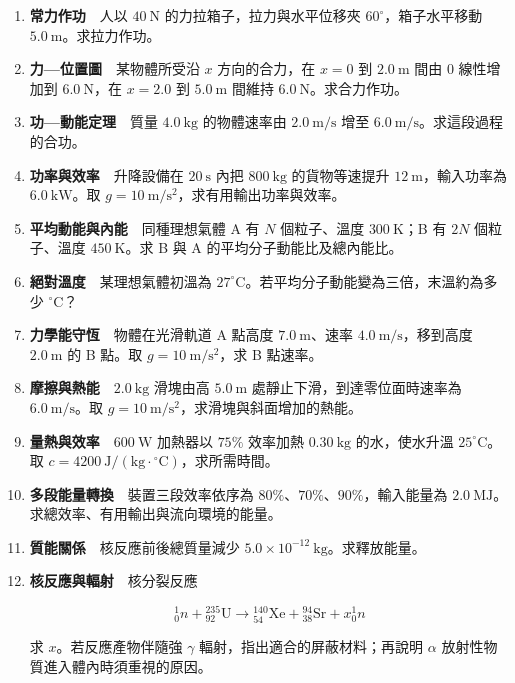 \documentclass[11pt,a4paper]{article}
\begin{document}
\begin{enumerate}
\def\labelenumi{\arabic{enumi}.}
\item
  \textbf{常力作功}　人以 \(40\ \mathrm N\) 的力拉箱子，拉力與水平位移夾 \(60^\circ\)，箱子水平移動 \(5.0\ \mathrm m\)。求拉力作功。
\item
  \textbf{力---位置圖}　某物體所受沿 \(x\) 方向的合力，在 \(x=0\) 到 \(2.0\ \mathrm m\) 間由 \(0\) 線性增加到 \(6.0\ \mathrm N\)，在 \(x=2.0\) 到 \(5.0\ \mathrm m\) 間維持 \(6.0\ \mathrm N\)。求合力作功。
\item
  \textbf{功---動能定理}　質量 \(4.0\ \mathrm{kg}\) 的物體速率由 \(2.0\ \mathrm{m/s}\) 增至 \(6.0\ \mathrm{m/s}\)。求這段過程的合功。
\item
  \textbf{功率與效率}　升降設備在 \(20\ \mathrm s\) 內把 \(800\ \mathrm{kg}\) 的貨物等速提升 \(12\ \mathrm m\)，輸入功率為 \(6.0\ \mathrm{kW}\)。取 \(g=10\ \mathrm{m/s^2}\)，求有用輸出功率與效率。
\item
  \textbf{平均動能與內能}　同種理想氣體 A 有 \(N\) 個粒子、溫度 \(300\ \mathrm K\)；B 有 \(2N\) 個粒子、溫度 \(450\ \mathrm K\)。求 B 與 A 的平均分子動能比及總內能比。
\item
  \textbf{絕對溫度}　某理想氣體初溫為 \(27^\circ\mathrm C\)。若平均分子動能變為三倍，末溫約為多少 \(^\circ\mathrm C\)？
\item
  \textbf{力學能守恆}　物體在光滑軌道 A 點高度 \(7.0\ \mathrm m\)、速率 \(4.0\ \mathrm{m/s}\)，移到高度 \(2.0\ \mathrm m\) 的 B 點。取 \(g=10\ \mathrm{m/s^2}\)，求 B 點速率。
\item
  \textbf{摩擦與熱能}　\(2.0\ \mathrm{kg}\) 滑塊由高 \(5.0\ \mathrm m\) 處靜止下滑，到達零位面時速率為 \(6.0\ \mathrm{m/s}\)。取 \(g=10\ \mathrm{m/s^2}\)，求滑塊與斜面增加的熱能。
\item
  \textbf{量熱與效率}　\(600\ \mathrm W\) 加熱器以 \(75\%\) 效率加熱 \(0.30\ \mathrm{kg}\) 的水，使水升溫 \(25^\circ\mathrm C\)。取 \(c=4200\ \mathrm{J/(kg\cdot{}^\circ C)}\)，求所需時間。
\item
  \textbf{多段能量轉換}　裝置三段效率依序為 \(80\%\)、\(70\%\)、\(90\%\)，輸入能量為 \(2.0\ \mathrm{MJ}\)。求總效率、有用輸出與流向環境的能量。
\item
  \textbf{質能關係}　核反應前後總質量減少 \(5.0\times10^{-12}\ \mathrm{kg}\)。求釋放能量。
\item
  \textbf{核反應與輻射}　核分裂反應

  \[
  {}^1_0n+{}^{235}_{92}\mathrm U
  \rightarrow{}^{140}_{54}\mathrm{Xe}
  +{}^{94}_{38}\mathrm{Sr}+x{}^1_0n
  \]

  求 \(x\)。若反應產物伴隨強 \(\gamma\) 輻射，指出適合的屏蔽材料；再說明 \(\alpha\) 放射性物質進入體內時須重視的原因。
\end{enumerate}
\end{document}
